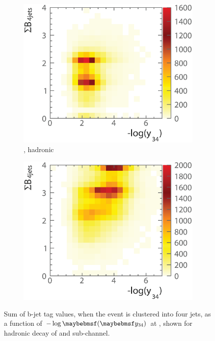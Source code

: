 \begin{figure}[!tbp]
  \begin{subfigure}[b]{0.45\textwidth}
    \includegraphics[width=\textwidth]{doubleHiggs/preSel/mutual6022bbWW2}
    \caption{\eeToHHbbWW, hadronic}
    \label{fig:doubleHiggs1.4MutualbbWW}
  \end{subfigure}
    \begin{subfigure}[b]{0.45\textwidth}
    \includegraphics[width=\textwidth]{doubleHiggs/preSel/mutual6022bbbb2}
    \caption{\eeToHHbbbb}
    \label{fig:doubleHiggs1.4Mutualbbbb}
  \end{subfigure}
\caption[Sum of b-jet tag values as a function of $-\log\parenths{\y{34}}$ at ]%
   {Sum of b-jet tag values, when the event is clustered into four jets, as a function of $-\log\parenths{\y{34}}$ at , shown for hadronic \WW decay of \eeToHHbbWW and \eeToHHbbbb sub-channel. }
   \label{fig:doubleHiggsMutualPreselection}
\end{figure}


